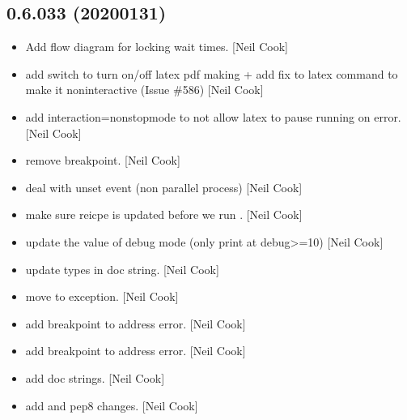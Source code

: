 \documentclass[a4paper,10pt,english]{report}
\begin{document}
\subsection{0.6.033 (2020\sphinxhyphen{}01\sphinxhyphen{}31)}
\label{\detokenize{misc/changelog:id5}}\begin{itemize}
\item {} 
Add flow diagram for locking wait times. {[}Neil Cook{]}

\item {} 
 \sphinxhyphen{} add switch to turn on/off latex pdf making + add
fix to latex command to make it non\sphinxhyphen{}interactive (Issue \#586) {[}Neil
Cook{]}

\item {} 
 \sphinxhyphen{} add \sphinxhyphen{}interaction=nonstopmode to not allow latex
to pause running on error. {[}Neil Cook{]}

\item {} 
 \sphinxhyphen{} remove breakpoint. {[}Neil Cook{]}

\item {} 
 \sphinxhyphen{} deal with unset event (non\sphinxhyphen{}
parallel process) {[}Neil Cook{]}

\item {} 
 \sphinxhyphen{} make sure reicpe is updated before we run
. {[}Neil Cook{]}

\item {} 
 \sphinxhyphen{} update the value of debug
mode (only print at debug\textgreater{}=10) {[}Neil Cook{]}

\item {} 
 \sphinxhyphen{} update types in doc string.
{[}Neil Cook{]}

\item {} 
 \sphinxhyphen{} move  to exception. {[}Neil Cook{]}

\item {} 
 \sphinxhyphen{} add breakpoint to address error. {[}Neil Cook{]}

\item {} 
 \sphinxhyphen{} add breakpoint to address error. {[}Neil Cook{]}

\item {} 
 \sphinxhyphen{} add doc strings. {[}Neil Cook{]}

\item {} 
 \sphinxhyphen{} add  and pep8 changes. {[}Neil
Cook{]}

\end{itemize}
\end{document}
